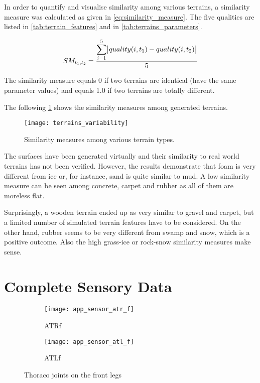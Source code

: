 In order to quantify and visualise similarity among various terrains, a similarity measure was calculated as given in \cref{eq:similarity_measure}. The five qualities are listed in \cref{tab:terrain_features} and in \cref{tab:terrains_parameters}.

\begin{align} \label{eq:similarity_measure}
  SM_{t_1, t_2} = \frac{\displaystyle\sum_{i=1}^{5} \abs{quality(i, t_1) - quality(i, t_2)}}{5}
\end{align} 

The similarity measure equals 0 if two terrains are identical (have the same parameter values) and equals 1.0 if two terrains are totally different.

The following \cref{fig:terrain_similarity_measures} shows the similarity measures among generated terrains.

\begin{figure}[H]
  \centering
  \texttt{[image: terrains\_variability]}
  \caption{Similarity measures among various terrain types.}
  \label{fig:terrain_similarity_measures}
\end{figure}

The surfaces have been generated virtually and their similarity to real world terrains has not been verified. However, the results demonstrate that foam is very different from ice or, for instance, sand is quite similar to mud. A low similarity measure can be seen among concrete, carpet and rubber as all of them are moreless flat.

Surprisingly, a wooden terrain ended up as very similar to gravel and carpet, but a limited number of simulated terrain features have to be considered. 
On the other hand, rubber seems to be very different from swamp and snow, which is a positive outcome. Also the high grass-ice or rock-snow similarity measures make sense. 

\section{Complete Sensory Data} \label{sec:complete_sensory_data}

\begin{figure}[H]
\centering
\begin{subfigure}{0.48\textwidth}
  \centering
  \texttt{[image: app\_sensor\_atr\_f]}
  \caption{ATRf}
  \label{fig:app_atr_f}
\end{subfigure}
\begin{subfigure}{0.48\textwidth}
  \centering
  \texttt{[image: app\_sensor\_atl\_f]}
  \caption{ATLf}
  \label{fig:app_atl_f}
\end{subfigure}
\caption{Thoraco joints on the front legs}
\label{fig:app_at_f}
\end{figure}

